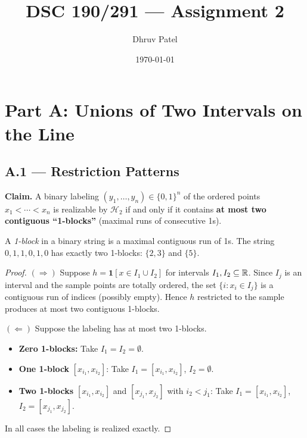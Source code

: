 \documentclass{article}
\title{\textbf{DSC 190/291 --- Assignment 2}}
\author{Dhruv Patel}
\date{\today}
\begin{document}
 
\maketitle
\tableofcontents
\newpage
 
\section{Part A: Unions of Two Intervals on the Line}
 
\subsection{A.1 --- Restriction Patterns}
 
\begin{summarybox}
\textbf{Claim.} A binary labeling $(y_1,\dots,y_n)\in\{0,1\}^n$ of the ordered
points $x_1<\cdots<x_n$ is realizable by $\mathcal{H}_2$ if and only if it
contains \textbf{at most two contiguous ``1-blocks''} (maximal runs of
consecutive 1s).
\end{summarybox}
 
\begin{definition}
A \emph{1-block} in a binary string is a maximal contiguous run of 1s.
The string $0,1,1,0,1,0$ has exactly two 1-blocks: $\{2,3\}$ and $\{5\}$.
\end{definition}
 
\begin{proof}
$(\Rightarrow)$
Suppose $h=\mathbf{1}[x\in I_1\cup I_2]$ for intervals $I_1,I_2\subseteq\mathbb{R}$.
Since $I_j$ is an interval and the sample points are totally ordered, the
set $\{i:x_i\in I_j\}$ is a contiguous run of indices (possibly empty).
Hence $h$ restricted to the sample produces at most two contiguous 1-blocks.
 
$(\Leftarrow)$
Suppose the labeling has at most two 1-blocks.
\begin{itemize}
  \item \textbf{Zero 1-blocks:} Take $I_1=I_2=\emptyset$.
  \item \textbf{One 1-block} $[x_{i_1},x_{i_2}]$: Take
        $I_1=[x_{i_1},x_{i_2}]$, $I_2=\emptyset$.
  \item \textbf{Two 1-blocks} $[x_{i_1},x_{i_2}]$ and $[x_{j_1},x_{j_2}]$
        with $i_2<j_1$: Take $I_1=[x_{i_1},x_{i_2}]$, $I_2=[x_{j_1},x_{j_2}]$.
\end{itemize}
In all cases the labeling is realized exactly.
\end{proof}
 
\end{document}
